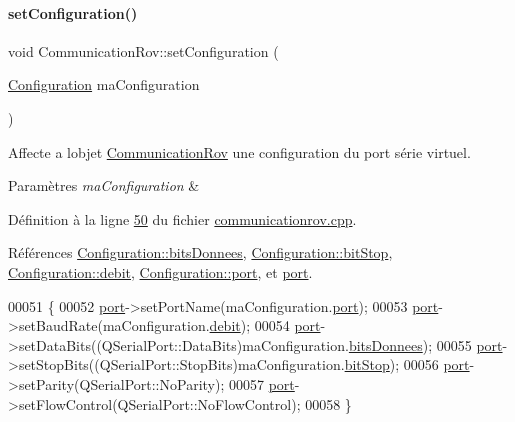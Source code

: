 \paragraph{\texorpdfstring{set\+Configuration()}{setConfiguration()}}
{\footnotesize\ttfamily void Communication\+Rov\+::set\+Configuration (\begin{DoxyParamCaption}\item[{\hyperlink{struct_configuration}{Configuration}}]{ma\+Configuration }\end{DoxyParamCaption})}



Affecte a l\textquotesingle{}objet \hyperlink{class_communication_rov}{Communication\+Rov} une configuration du port série virtuel. 


\begin{DoxyParams}{Paramètres}
{\em ma\+Configuration} & \\
\hline
\end{DoxyParams}


Définition à la ligne \hyperlink{communicationrov_8cpp_source_l00050}{50} du fichier \hyperlink{communicationrov_8cpp_source}{communicationrov.\+cpp}.



Références \hyperlink{communicationrov_8h_source_l00028}{Configuration\+::bits\+Donnees}, \hyperlink{communicationrov_8h_source_l00029}{Configuration\+::bit\+Stop}, \hyperlink{communicationrov_8h_source_l00027}{Configuration\+::debit}, \hyperlink{communicationrov_8h_source_l00026}{Configuration\+::port}, et \hyperlink{communicationrov_8h_source_l00042}{port}.


\begin{DoxyCode}
00051 \{
00052     \hyperlink{class_communication_rov_a21b62067ef0b2a6aec339df60b4abd72}{port}->setPortName(maConfiguration.\hyperlink{struct_configuration_acc40b4f298cb215a94fb43976ef7d3a8}{port});
00053     \hyperlink{class_communication_rov_a21b62067ef0b2a6aec339df60b4abd72}{port}->setBaudRate(maConfiguration.\hyperlink{struct_configuration_ab714d6036189bf451e566e6c6a971c85}{debit});
00054     \hyperlink{class_communication_rov_a21b62067ef0b2a6aec339df60b4abd72}{port}->setDataBits((QSerialPort::DataBits)maConfiguration.\hyperlink{struct_configuration_a37e0691e4a25b11bd86a52bc68c81f93}{bitsDonnees});
00055     \hyperlink{class_communication_rov_a21b62067ef0b2a6aec339df60b4abd72}{port}->setStopBits((QSerialPort::StopBits)maConfiguration.\hyperlink{struct_configuration_a9c24ff9a3e5a24b14e1ac8bc03de907d}{bitStop});
00056     \hyperlink{class_communication_rov_a21b62067ef0b2a6aec339df60b4abd72}{port}->setParity(QSerialPort::NoParity);
00057     \hyperlink{class_communication_rov_a21b62067ef0b2a6aec339df60b4abd72}{port}->setFlowControl(QSerialPort::NoFlowControl);
00058 \}
\end{DoxyCode}


